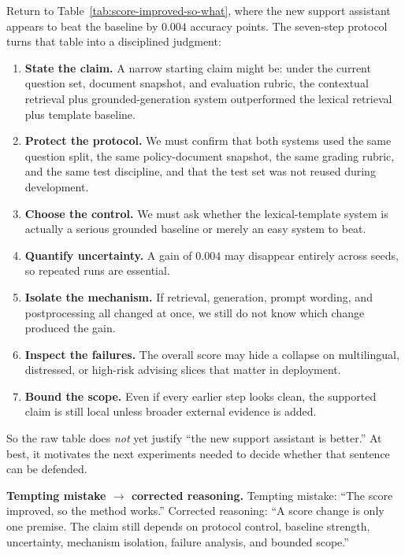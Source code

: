 Return to Table~\ref{tab:score-improved-so-what}, where the new support assistant appears to beat the baseline by $0.004$ accuracy points. The seven-step protocol turns that table into a disciplined judgment:
\begin{enumerate}[leftmargin=*]
\item \textbf{State the claim.} A narrow starting claim might be: under the current question set, document snapshot, and evaluation rubric, the contextual retrieval plus grounded-generation system outperformed the lexical retrieval plus template baseline.
\item \textbf{Protect the protocol.} We must confirm that both systems used the same question split, the same policy-document snapshot, the same grading rubric, and the same test discipline, and that the test set was not reused during development.
\item \textbf{Choose the control.} We must ask whether the lexical-template system is actually a serious grounded baseline or merely an easy system to beat.
\item \textbf{Quantify uncertainty.} A gain of $0.004$ may disappear entirely across seeds, so repeated runs are essential.
\item \textbf{Isolate the mechanism.} If retrieval, generation, prompt wording, and postprocessing all changed at once, we still do not know which change produced the gain.
\item \textbf{Inspect the failures.} The overall score may hide a collapse on multilingual, distressed, or high-risk advising slices that matter in deployment.
\item \textbf{Bound the scope.} Even if every earlier step looks clean, the supported claim is still local unless broader external evidence is added.
\end{enumerate}

So the raw table does \emph{not} yet justify ``the new support assistant is better.'' At best, it motivates the next experiments needed to decide whether that sentence can be defended.

\begin{thinkingtool}
\textbf{Tempting mistake $\rightarrow$ corrected reasoning.} Tempting mistake: ``The score improved, so the method works.'' Corrected reasoning: ``A score change is only one premise. The claim still depends on protocol control, baseline strength, uncertainty, mechanism isolation, failure analysis, and bounded scope.''
\end{thinkingtool}

